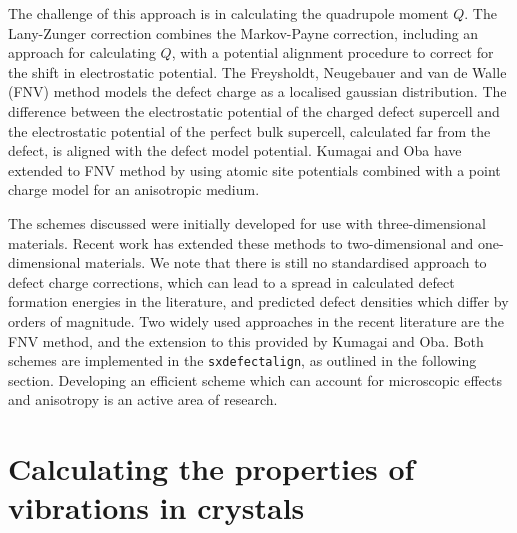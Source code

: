The challenge of this approach is in calculating the quadrupole moment $Q$. 
The Lany-Zunger correction\cite{Lany2009} combines the Markov-Payne correction, including an approach for calculating $Q$, with a potential alignment procedure to correct for the shift in electrostatic potential. 
The Freysholdt, Neugebauer and van de Walle (FNV) method\cite{Freysoldt2009} models the defect charge as a localised gaussian distribution. 
The difference between the electrostatic potential of the charged defect supercell and the electrostatic potential of the perfect bulk supercell, calculated far from the defect, is aligned with the defect model potential. 
Kumagai and Oba have extended to FNV method by using atomic site potentials combined with a point charge model for an anisotropic medium.\cite{Kumagai2014} 

The schemes discussed were initially developed for use with three-dimensional materials. 
Recent work has extended these methods to two-dimensional\cite{Freysoldt2018,Komsa2013} and one-dimensional\cite{Kim2014} materials.
We note that there is still no standardised approach to defect charge corrections, 
which can lead to a spread in calculated defect formation energies in the literature, and predicted defect densities which differ by orders of magnitude.
Two widely used approaches in the recent literature are the FNV method, and the extension to this provided by Kumagai and Oba.
Both schemes are implemented in the \texttt{sxdefectalign}, as outlined in the following section.
Developing an efficient scheme which can account for microscopic effects and anisotropy is an active area of research.\cite{durrant2018,Vinichenko2017}


\section{Calculating the properties of vibrations in crystals} \label{sec:latticedynamics}




